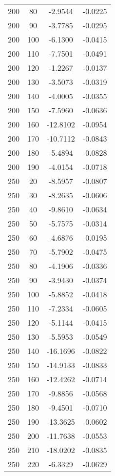 \documentclass[11pt]{article}
\begin{document}
\begin{center}
\begin{longtable}{cccc}
    200 &    80 & -2.9544 & -0.0225 \\ 
    200 &    90 & -3.7785 & -0.0295 \\ 
    200 &   100 & -6.1300 & -0.0415 \\ 
    200 &   110 & -7.7501 & -0.0491 \\ 
    200 &   120 & -1.2267 & -0.0137 \\ 
    200 &   130 & -3.5073 & -0.0319 \\ 
    200 &   140 & -4.0005 & -0.0355 \\ 
    200 &   150 & -7.5960 & -0.0636 \\ 
    200 &   160 & -12.8102 & -0.0954 \\ 
    200 &   170 & -10.7112 & -0.0843 \\ 
    200 &   180 & -5.4894 & -0.0828 \\ 
    200 &   190 & -4.0154 & -0.0718 \\ 
    250 &    20 & -8.5957 & -0.0807 \\ 
    250 &    30 & -8.2635 & -0.0606 \\ 
    250 &    40 & -9.8610 & -0.0634 \\ 
    250 &    50 & -5.7575 & -0.0314 \\ 
    250 &    60 & -4.6876 & -0.0195 \\ 
    250 &    70 & -5.7902 & -0.0475 \\ 
    250 &    80 & -4.1906 & -0.0336 \\ 
    250 &    90 & -3.9430 & -0.0374 \\ 
    250 &   100 & -5.8852 & -0.0418 \\ 
    250 &   110 & -7.2334 & -0.0605 \\ 
    250 &   120 & -5.1144 & -0.0415 \\ 
    250 &   130 & -5.5953 & -0.0549 \\ 
    250 &   140 & -16.1696 & -0.0822 \\ 
    250 &   150 & -14.9133 & -0.0833 \\ 
    250 &   160 & -12.4262 & -0.0714 \\ 
    250 &   170 & -9.8856 & -0.0568 \\ 
    250 &   180 & -9.4501 & -0.0710 \\ 
    250 &   190 & -13.3625 & -0.0602 \\ 
    250 &   200 & -11.7638 & -0.0553 \\ 
    250 &   210 & -18.0202 & -0.0835 \\ 
    250 &   220 & -6.3329 & -0.0629 \\ 

\end{longtable}
\end{center}
\end{document}
